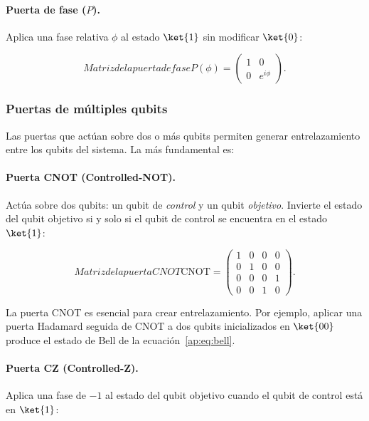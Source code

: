 \paragraph{Puerta de fase ($P$).} Aplica una fase relativa $\phi$ al estado $\ket{1}$ sin modificar $\ket{0}$:

\begin{equation}{Matriz de la puerta de fase}
P(\phi) = \begin{pmatrix} 1 & 0 \\ 0 & e^{i\phi} \end{pmatrix}.
\end{equation}

\subsubsection{Puertas de múltiples qubits}
\label{ap:subsubsec:puertasmultiplesqubits}

Las puertas que actúan sobre dos o más qubits permiten generar entrelazamiento entre los qubits del sistema. La más fundamental es:

\paragraph{Puerta CNOT (Controlled-NOT).} Actúa sobre dos qubits: un qubit de \textit{control} y un qubit \textit{objetivo}. Invierte el estado del qubit objetivo si y solo si el qubit de control se encuentra en el estado $\ket{1}$:

\begin{equation}{Matriz de la puerta CNOT}
\text{CNOT} = \begin{pmatrix} 1 & 0 & 0 & 0 \\ 0 & 1 & 0 & 0 \\ 0 & 0 & 0 & 1 \\ 0 & 0 & 1 & 0 \end{pmatrix}.
\end{equation}

La puerta CNOT es esencial para crear entrelazamiento. Por ejemplo, aplicar una puerta Hadamard seguida de CNOT a dos qubits inicializados en $\ket{00}$ produce el estado de Bell de la ecuación~\eqref{ap:eq:bell}.

\paragraph{Puerta CZ (Controlled-Z).} Aplica una fase de $-1$ al estado del qubit objetivo cuando el qubit de control está en $\ket{1}$:

